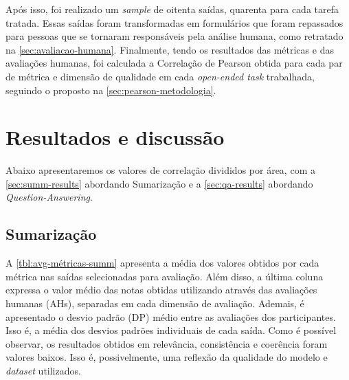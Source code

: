 \documentclass[cic,tc]{iiufrgs}
\begin{document}
Após isso, foi realizado um \textit{sample} de oitenta saídas, quarenta para cada tarefa tratada. Essas saídas foram transformadas em formulários que foram repassados para pessoas que se tornaram responsáveis pela análise humana, como retratado na \autoref{sec:avaliacao-humana}. Finalmente, tendo os resultados das métricas e das avaliações humanas, foi calculada a Correlação de Pearson obtida para cada par de métrica e dimensão de qualidade em cada \textit{open-ended task} trabalhada, seguindo o proposto na \autoref{sec:pearson-metodologia}.

\section{Resultados e discussão}
Abaixo apresentaremos os valores de correlação divididos por área, com a \autoref{sec:summ-results} abordando Sumarização e a \autoref{sec:qa-results} abordando \textit{Question-Answering}.

\subsection{Sumarização}
\label{sec:summ-results}
A \autoref{tbl:avg-métricas-summ} apresenta a média dos valores obtidos por cada métrica nas saídas selecionadas para avaliação. Além disso, a última coluna expressa o valor médio das notas obtidas utilizando através das avaliações humanas (AHs), separadas em cada dimensão de avaliação. Ademais, é apresentado o desvio padrão (DP) médio entre as avaliações dos participantes. Isso é, a média dos desvios padrões individuais de cada saída. 
Como é possível observar, os resultados obtidos em relevância, consistência e coerência foram valores baixos. Isso é, possivelmente, uma reflexão da qualidade do modelo e \textit{dataset} utilizados.
\end{document}

